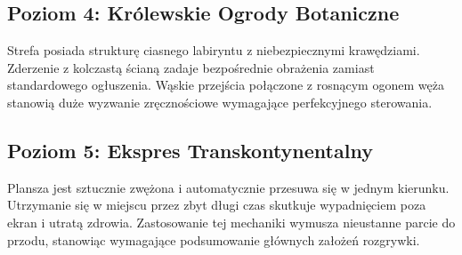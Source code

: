 \documentclass[12pt, letterpaper,Titlepage]{article}
\begin{document}
\subsection{Poziom 4: Królewskie Ogrody Botaniczne}
Strefa posiada strukturę ciasnego labiryntu z niebezpiecznymi krawędziami. Zderzenie z kolczastą ścianą zadaje bezpośrednie obrażenia zamiast standardowego ogłuszenia. Wąskie przejścia połączone z rosnącym ogonem węża stanowią duże wyzwanie zręcznościowe wymagające perfekcyjnego sterowania.

\subsection{Poziom 5: Ekspres Transkontynentalny}
Plansza jest sztucznie zwężona i automatycznie przesuwa się w jednym kierunku. Utrzymanie się w miejscu przez zbyt długi czas skutkuje wypadnięciem poza ekran i utratą zdrowia. Zastosowanie tej mechaniki wymusza nieustanne parcie do przodu, stanowiąc wymagające podsumowanie głównych założeń rozgrywki.
\end{document}
